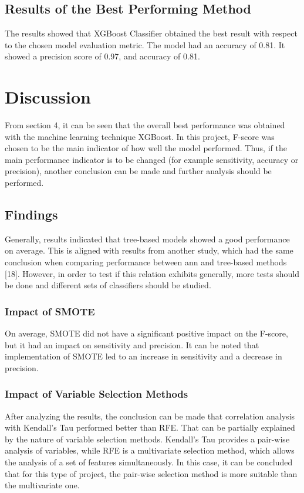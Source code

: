 \documentclass[a4paper]{article}
\begin{document}
\subsection{Results of the Best Performing Method}
The results showed that XGBoost Classifier obtained the best result with respect to the chosen model evaluation metric. The model had an accuracy of 0.81. It showed a precision score of 0.97, and accuracy of 0.81. 

\section{Discussion}
From section 4, it can be seen that the overall best performance was obtained with the machine learning technique XGBoost. In this project, F-score was chosen to be the main indicator of how well the model performed. Thus, if the main performance indicator is to be changed (for example sensitivity, accuracy or precision), another conclusion can be made and further analysis should be performed.

\subsection{Findings}
Generally, results indicated that tree-based models showed a good performance on average. This is aligned with results from another study, which had the same conclusion when comparing performance between \gls{ann} and tree-based methods [18]. However, in order to test if this relation exhibits generally, more tests should be done and different sets of classifiers should be studied.

\subsubsection{Impact of SMOTE}
On average, SMOTE did not have a significant positive impact on the F-score, but it had an impact on sensitivity and precision. It can be noted that implementation of SMOTE led to an increase in sensitivity and a decrease in precision.

\subsubsection{Impact of Variable Selection Methods}
After analyzing the results, the conclusion can be made that correlation analysis with Kendall’s Tau performed better than RFE. That can be partially explained by the nature of variable selection methods. Kendall’s Tau provides a pair-wise analysis of variables, while RFE is a multivariate selection method, which allows the analysis of a set of features simultaneously. In this case, it can be concluded that for this type of project, the pair-wise selection method is more suitable than the multivariate one.
\end{document}
